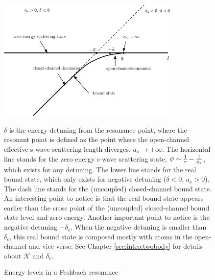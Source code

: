 

\begin{figure}[htbp]
\begin{center}
\includegraphics[width=0.8\textwidth]{levels}
\caption{Energy levels in a Feshbach resonance\label{fig:intro:levels}} 
\parbox{0.7\textwidth}{\small $\delta$ is the energy detuning from the resonance point, where the resonant point is defined as the point where the open-channel effective s-wave scattering length diverges, $a_s\to\pm\infty$.  The horizontal line stands for the zero energy s-wave scattering state, $\psi\sim\frac{1}{r}-\frac{1}{a_s}$, which exists for any detuning.  The lower line stands for the real bound state, which only exists for negative detuning ($\delta<0$, $a_s>0$). The dash line stands for the (uncoupled) closed-channel bound state.  An interesting point to notice is that the real bound state appears earlier than the cross point of the (uncoupled) closed-channel bound state level and zero energy. Another important point to notice is the negative detuning $-\delta_c$.  When the negative detuning is smaller than $\delta_c$, this real bound state is composed mostly with atoms in the open-channel and vice verse.  See Chapter \ref{sec:intro:twobody} for details about $\mathcal{K}$ and $\delta_c$.   }

\end{center}
\end{figure}

